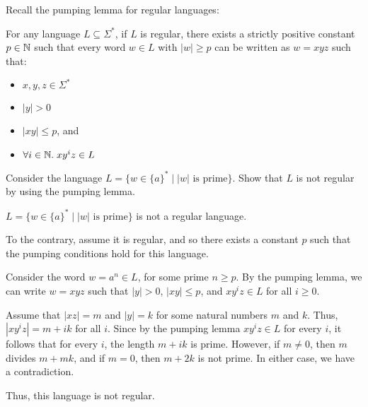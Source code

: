 
\begin{exercise}{}

  Recall the pumping lemma for regular languages:

  For any language \(L \subseteq \Sigma^*\), if \(L\) is regular, there exists a
  strictly positive constant \(p \in \mathbb{N}\) such that every word \(w \in
  L\) with \(|w| \geq p\) can be written as \(w = xyz\) such that:

  \begin{itemize}
    \item \(x, y, z \in \Sigma^*\)
    \item \(|y| > 0\)
    \item \(|xy| \leq p\), and
    \item \(\forall i \in \mathbb{N}.\; xy^iz \in L\)
  \end{itemize}

  Consider the language \(L = \{w \in \{a\}^* \mid |w| \text{ is prime}\}\).
  Show that \(L\) is not regular by using the pumping lemma.
  
  \begin{solution}
      \(L = \{w \in \{a\}^* \mid |w| \text{ is prime}\}\) is not a regular
      language.

      To the contrary, assume it is regular, and so there exists a constant
      \(p\) such that the pumping conditions hold for this language. 
      
      Consider the word \(w = a^{n} \in L\), for some prime \(n \geq p\). By the
      pumping lemma, we can write \(w = xyz\) such that \(|y| > 0\), \(|xy| \leq
      p\), and \(xy^iz \in L\) for all \(i \geq 0\).
      
      Assume that \(|xz| = m\) and \(|y| = k\) for some natural numbers \(m\)
      and \(k\). Thus, \(|xy^iz| = m + ik\) for all \(i\). Since by the pumping
      lemma \(xy^iz \in L\) for every \(i\), it follows that for every \(i\),
      the length \(m + ik\) is prime. However, if \(m \not = 0\), then \(m\)
      divides \(m + mk\), and if \(m = 0\), then \(m + 2k\) is not prime. In
      either case, we have a contradiction.

      Thus, this language is not regular.

  \end{solution}

\end{exercise}
